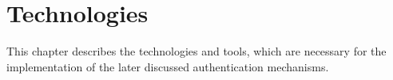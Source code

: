 \chapter{Technologies}
This chapter describes the technologies and tools, which are necessary for the implementation of the later discussed authentication mechanisms.



